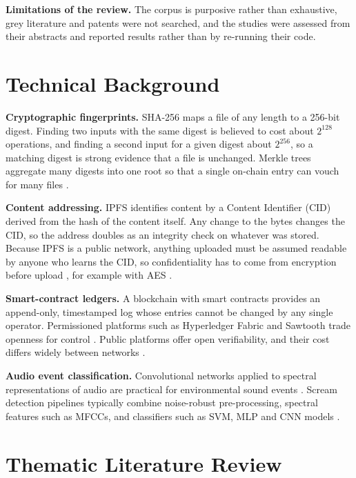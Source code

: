 \documentclass[conference,a4paper,10pt]{IEEEtran}
\begin{document}
\textbf{Limitations of the review.} The corpus is purposive rather than exhaustive, grey literature and patents were not searched, and the studies were assessed from their abstracts and reported results rather than by re-running their code.

\section{Technical Background}\label{sec:background}
\textbf{Cryptographic fingerprints.} SHA-256 \cite{nist180} maps a file of any length to a 256-bit digest. Finding two inputs with the same digest is believed to cost about $2^{128}$ operations, and finding a second input for a given digest about $2^{256}$, so a matching digest is strong evidence that a file is unchanged. Merkle trees aggregate many digests into one root so that a single on-chain entry can vouch for many files \cite{jaquet,rani}.

\textbf{Content addressing.} IPFS \cite{benet} identifies content by a Content Identifier (CID) derived from the hash of the content itself. Any change to the bytes changes the CID, so the address doubles as an integrity check on whatever was stored. Because IPFS is a public network, anything uploaded must be assumed readable by anyone who learns the CID, so confidentiality has to come from encryption before upload \cite{saif}, for example with AES \cite{nist197}.

\textbf{Smart-contract ledgers.} A blockchain with smart contracts provides an append-only, timestamped log whose entries cannot be changed by any single operator. Permissioned platforms such as Hyperledger Fabric and Sawtooth trade openness for control \cite{jeong,khan}. Public platforms offer open verifiability, and their cost differs widely between networks \cite{ratul}.

\textbf{Audio event classification.} Convolutional networks applied to spectral representations of audio are practical for environmental sound events \cite{hershey,salamon}. Scream detection pipelines typically combine noise-robust pre-processing, spectral features such as MFCCs, and classifiers such as SVM, MLP and CNN models \cite{bhad}.

\section{Thematic Literature Review}\label{sec:review}
\end{document}
